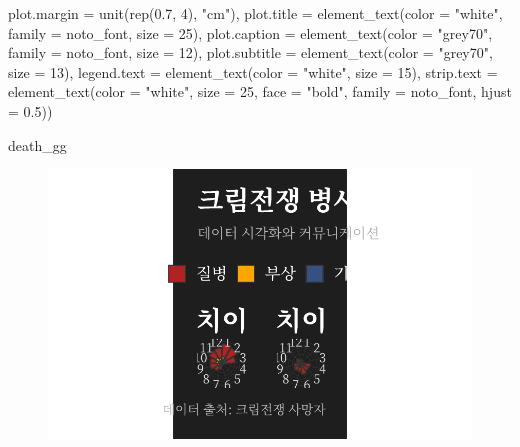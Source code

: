 \documentclass[
  letterpaper,
  chapter,a4paper,showtrims,openright,hidelinks]{oblivoir}
\newenvironment{Shaded}{\begin{snugshade}}{\end{snugshade}}
\newcommand{\AttributeTok}[1]{\textcolor[rgb]{0.40,0.45,0.13}{#1}}
\newcommand{\DecValTok}[1]{\textcolor[rgb]{0.68,0.00,0.00}{#1}}
\newcommand{\FloatTok}[1]{\textcolor[rgb]{0.68,0.00,0.00}{#1}}
\newcommand{\FunctionTok}[1]{\textcolor[rgb]{0.28,0.35,0.67}{#1}}
\newcommand{\NormalTok}[1]{\textcolor[rgb]{0.00,0.23,0.31}{#1}}
\newcommand{\StringTok}[1]{\textcolor[rgb]{0.13,0.47,0.30}{#1}}
\begin{document}
\begin{Shaded}
\begin{Highlighting}[]
        \AttributeTok{plot.margin =} \FunctionTok{unit}\NormalTok{(}\FunctionTok{rep}\NormalTok{(}\FloatTok{0.7}\NormalTok{, }\DecValTok{4}\NormalTok{), }\StringTok{"cm"}\NormalTok{),}
        \AttributeTok{plot.title =} \FunctionTok{element\_text}\NormalTok{(}\AttributeTok{color =} \StringTok{"white"}\NormalTok{, }\AttributeTok{family =}\NormalTok{ noto\_font, }\AttributeTok{size =} \DecValTok{25}\NormalTok{),}
        \AttributeTok{plot.caption =} \FunctionTok{element\_text}\NormalTok{(}\AttributeTok{color =} \StringTok{"grey70"}\NormalTok{, }\AttributeTok{family =}\NormalTok{ noto\_font, }\AttributeTok{size =} \DecValTok{12}\NormalTok{),}
        \AttributeTok{plot.subtitle =} \FunctionTok{element\_text}\NormalTok{(}\AttributeTok{color =} \StringTok{"grey70"}\NormalTok{, }\AttributeTok{size =} \DecValTok{13}\NormalTok{),}
        \AttributeTok{legend.text =} \FunctionTok{element\_text}\NormalTok{(}\AttributeTok{color =} \StringTok{"white"}\NormalTok{, }\AttributeTok{size =} \DecValTok{15}\NormalTok{),}
        \AttributeTok{strip.text =} \FunctionTok{element\_text}\NormalTok{(}\AttributeTok{color =} \StringTok{"white"}\NormalTok{, }\AttributeTok{size =} \DecValTok{25}\NormalTok{, }\AttributeTok{face =} \StringTok{"bold"}\NormalTok{, }\AttributeTok{family =}\NormalTok{ noto\_font, }\AttributeTok{hjust =} \FloatTok{0.5}\NormalTok{))}

\NormalTok{death\_gg}
\end{Highlighting}
\end{Shaded}

\begin{figure}[H]

{\centering \includegraphics{cs_nightingale_files/figure-pdf/unnamed-chunk-4-1.pdf}

}

\end{figure}
\end{document}
